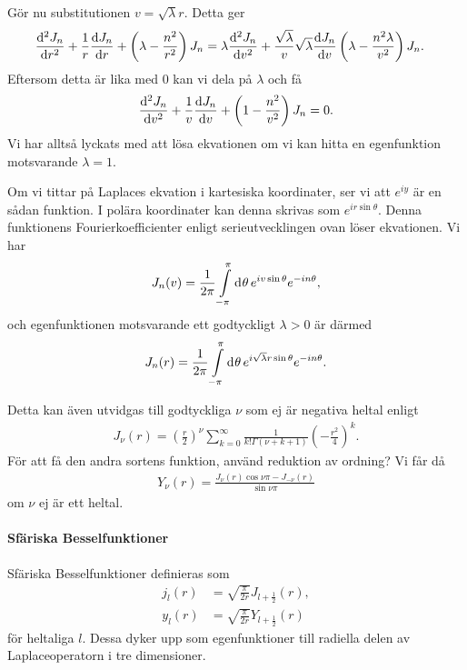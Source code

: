Gör nu substitutionen $v = \sqrt{\lambda}r$. Detta ger
\begin{align*}
	\dv[2]{J_{n}}{r} + \frac{1}{r}\dv{J_{n}}{r} + \left(\lambda - \frac{n^{2}}{r^{2}}\right)J_{n} &= \lambda\dv[2]{J_{n}}{v} + \frac{\sqrt{\lambda}}{v}\sqrt{\lambda}\dv{J_{n}}{v} \left(\lambda - \frac{n^{2}\lambda}{v^{2}}\right)J_{n}.
\end{align*}
Eftersom detta är lika med $0$ kan vi dela på $\lambda$ och få
\begin{align*}
	\dv[2]{J_{n}}{v} + \frac{1}{v}\dv{J_{n}}{v} + \left(1 - \frac{n^{2}}{v^{2}}\right)J_{n} = 0.
\end{align*}
Vi har alltså lyckats med att lösa ekvationen om vi kan hitta en egenfunktion motsvarande $\lambda = 1$.

Om vi tittar på Laplaces ekvation i kartesiska koordinater, ser vi att $e^{iy}$ är en sådan funktion. I polära koordinater kan denna skrivas som $e^{ir\sin{\theta}}$. Denna funktionens Fourierkoefficienter enligt serieutvecklingen ovan löser ekvationen. Vi har
\begin{align*}
	J_{n}(v) = \frac{1}{2\pi}\int\limits_{-\pi}^{\pi}\dd[]{\theta}e^{iv\sin{\theta}}e^{-in\theta},
\end{align*}
och egenfunktionen motsvarande ett godtyckligt $\lambda > 0$ är därmed
\begin{align*}
	J_{n}(r) = \frac{1}{2\pi}\int\limits_{-\pi}^{\pi}\dd[]{\theta}e^{i\sqrt{\lambda}r\sin{\theta}}e^{-in\theta}.
\end{align*}

Detta kan även utvidgas till godtyckliga $\nu$ som ej är negativa heltal enligt
\begin{align*}
	J_{\nu}(r) = \left(\frac{r}{2}\right)^{\nu}\sum\limits_{k = 0}^{\infty}\frac{1}{k!\Gamma(\nu + k + 1)}\left(-\frac{r^{2}}{4}\right)^{k}.
\end{align*}
För att få den andra sortens funktion, använd reduktion av ordning? Vi får då
\begin{align*}
	Y_{\nu}(r) = \frac{J_{\nu}(r)\cos{\nu\pi} - J_{-\nu}(r)}{\sin{\nu\pi}}
\end{align*}
om $\nu$ ej är ett heltal.

\paragraph{Sfäriska Besselfunktioner}
Sfäriska Besselfunktioner definieras som
\begin{align*}
	j_{l}(r) &= \sqrt{\frac{\pi}{2r}}J_{l + \frac{1}{2}}(r), \\
	y_{l}(r) &= \sqrt{\frac{\pi}{2r}}Y_{l + \frac{1}{2}}(r)
\end{align*}
för heltaliga $l$. Dessa dyker upp som egenfunktioner till radiella delen av Laplaceoperatorn i tre dimensioner.

